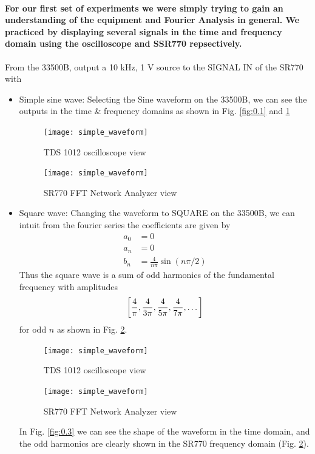 \documentclass[../main.tex]{subfiles}
\begin{document}
\paragraph{For our first set of experiments we were simply trying to gain an understanding of the equipment and Fourier Analysis in general. We practiced by displaying several signals in the time and frequency domain using the oscilloscope and SSR770 repsectively.}
From the 33500B, output a 10 kHz, 1 V source to the SIGNAL IN of the SR770 with 
\begin{itemize}
    \item Simple sine wave: Selecting the Sine waveform on the 33500B, we can see the outputs in the time \& frequency domains
    as shown in Fig. \ref{fig:0.1} and \ref{fig:0.2}
    \begin{figure}[ht]
        \centering
        \begin{minipage}{0.5\textwidth}
            \centering
            \texttt{[image: simple\_waveform]}
            \caption{TDS 1012 oscilloscope view}
            \label{fig:0.1}
        \end{minipage}\hfill
        \begin{minipage}{0.5\textwidth}
            \centering
            \texttt{[image: simple\_waveform]}
            \caption{SR770 FFT Network Analyzer view}
            \label{fig:0.2}
        \end{minipage}
    \end{figure}
    \newpage
    \item Square wave: Changing the waveform to SQUARE on the 33500B, we can intuit from the fourier series the coefficients are given by
    \begin{align*}
        a_0 &= 0 \\
        a_n &= 0 \\
        b_n &= \frac{4}{n\pi} \sin(n\pi/2)
    \end{align*}
    Thus the square wave is a sum of odd harmonics of the fundamental frequency with amplitudes
    \begin{align*}
        \qt[\frac{4}{\pi}, \frac{4}{3\pi}, \frac{4}{5\pi}, \frac{4}{7\pi}, \dots]
    \end{align*}
    for odd $n$ as shown in Fig. \ref{fig:0.4}.
    \begin{figure}[ht]
        \centering
        \begin{minipage}{0.5\textwidth}
            \centering
            \texttt{[image: simple\_waveform]}
            \caption{TDS 1012 oscilloscope view}
            \label{fig:0.3}
        \end{minipage}\hfill
        \begin{minipage}{0.5\textwidth}
            \centering
            \texttt{[image: simple\_waveform]}
            \caption{SR770 FFT Network Analyzer view}
            \label{fig:0.4}
        \end{minipage}
    \end{figure}
    In Fig. \ref{fig:0.3} we can see the shape of the waveform in the time domain,
    and the odd harmonics are clearly shown in the SR770 frequency domain (Fig. \ref{fig:0.4}). 


\end{itemize}
\end{document}
